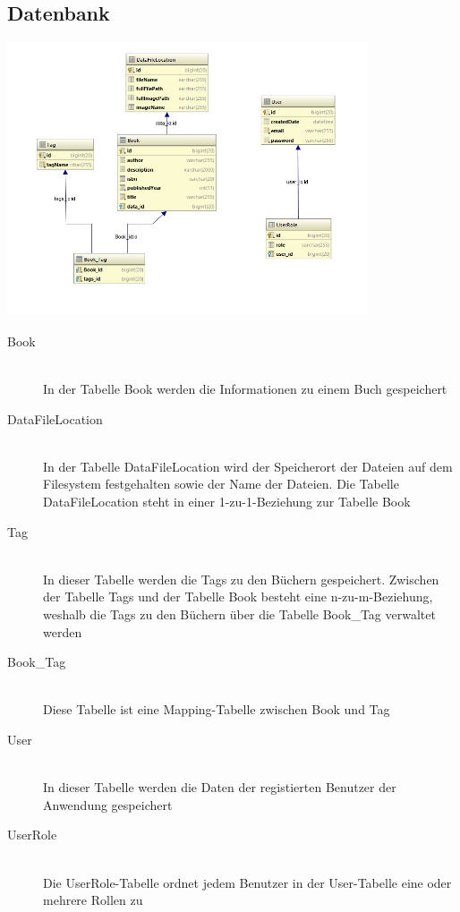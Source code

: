 \documentclass[12pt,a4paper]{book}
\begin{document}
		\subsection{Datenbank}
			\begin{center}
				\includegraphics[width=0.8\textwidth]{Images/database.png}
				\label{fig2}
			\end{center}
		\begin{description}
			\item[Book] \hfill \\
				In der Tabelle Book  werden die Informationen zu einem Buch gespeichert
				\item[DataFileLocation] \hfill \\
				In der Tabelle DataFileLocation  wird der Speicherort der Dateien auf dem Filesystem festgehalten sowie der Name der Dateien. Die Tabelle DataFileLocation steht in einer 1-zu-1-Beziehung zur Tabelle Book
				\item[Tag]\hfill \\
				In dieser Tabelle werden die Tags zu den Büchern gespeichert. Zwischen der Tabelle Tags und der Tabelle Book besteht eine n-zu-m-Beziehung, weshalb die Tags zu den Büchern über die Tabelle Book_Tag verwaltet werden
				\item[Book_Tag]\hfill \\
				Diese Tabelle ist eine Mapping-Tabelle zwischen Book und Tag
				\item[User]\hfill \\
				In dieser Tabelle werden die Daten der registierten Benutzer der Anwendung gespeichert
				\item[UserRole]\hfill \\
				Die UserRole-Tabelle ordnet jedem Benutzer in der User-Tabelle eine oder mehrere Rollen zu
		\end{description}
			
		
		
\end{document}

